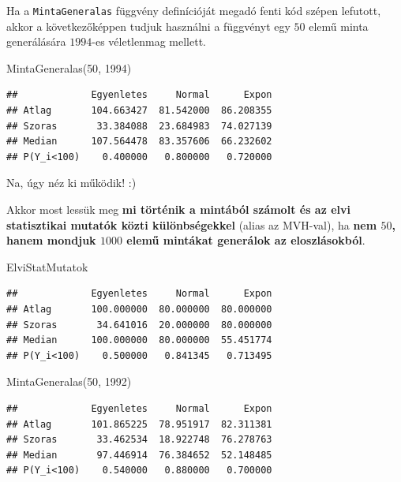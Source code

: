 \documentclass[
]{book}
\newenvironment{Shaded}{\begin{snugshade}}{\end{snugshade}}
\newcommand{\DecValTok}[1]{\textcolor[rgb]{0.00,0.00,0.81}{#1}}
\newcommand{\NormalTok}[1]{#1}
\begin{document}
Ha a \texttt{MintaGeneralas} függvény definícióját megadó fenti kód szépen lefutott, akkor a következőképpen tudjuk használni a függvényt egy \(50\) elemű minta generálására \(1994\)-es véletlenmag mellett.

\begin{Shaded}
\begin{Highlighting}[]
\NormalTok{MintaGeneralas(}\DecValTok{50}\NormalTok{, }\DecValTok{1994}\NormalTok{)}
\end{Highlighting}
\end{Shaded}

\begin{verbatim}
##             Egyenletes     Normal      Expon
## Atlag       104.663427  81.542000  86.208355
## Szoras       33.384088  23.684983  74.027139
## Median      107.564478  83.357606  66.232602
## P(Y_i<100)    0.400000   0.800000   0.720000
\end{verbatim}

Na, úgy néz ki működik! :)

Akkor most lessük meg \textbf{mi történik a mintából számolt és az elvi statisztikai mutatók közti különbségekkel} (alias az MVH-val), ha \textbf{nem \(50\), hanem mondjuk \(1000\) elemű mintákat generálok az eloszlásokból}.

\begin{Shaded}
\begin{Highlighting}[]
\NormalTok{ElviStatMutatok}
\end{Highlighting}
\end{Shaded}

\begin{verbatim}
##             Egyenletes     Normal      Expon
## Atlag       100.000000  80.000000  80.000000
## Szoras       34.641016  20.000000  80.000000
## Median      100.000000  80.000000  55.451774
## P(Y_i<100)    0.500000   0.841345   0.713495
\end{verbatim}

\begin{Shaded}
\begin{Highlighting}[]
\NormalTok{MintaGeneralas(}\DecValTok{50}\NormalTok{, }\DecValTok{1992}\NormalTok{)}
\end{Highlighting}
\end{Shaded}

\begin{verbatim}
##             Egyenletes     Normal      Expon
## Atlag       101.865225  78.951917  82.311381
## Szoras       33.462534  18.922748  76.278763
## Median       97.446914  76.384652  52.148485
## P(Y_i<100)    0.540000   0.880000   0.700000
\end{verbatim}
\end{document}
